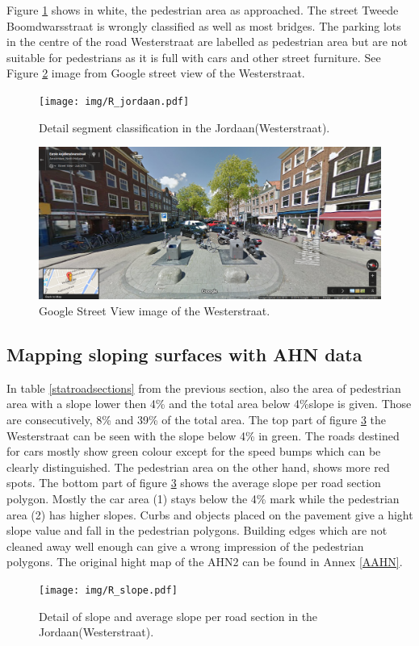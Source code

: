 Figure \ref{jordaanroad} shows in white, the pedestrian area as approached. The street Tweede Boomdwarsstraat is wrongly classified as well as most bridges. The parking lots in the centre of the road Westerstraat are labelled as pedestrian area but are not suitable for pedestrians as it is full with cars and other street furniture. See Figure \ref{westerstraat} image from Google street view of the Westerstraat. 

\begin{figure}[h]
\texttt{[image: img/R\_jordaan.pdf]}
\centering
\caption{Detail segment classification in the Jordaan(Westerstraat).\label{jordaanroad}}
\end{figure} 

\begin{figure}[h]
\includegraphics[width=\textwidth]{img/R_Westerstraat.png}
\centering
\caption{Google Street View image of the Westerstraat.\label{westerstraat}}
\end{figure} 


\clearpage

\subsection{Mapping sloping surfaces with AHN data}
In table \ref{statroadsections} from the previous section, also the area of pedestrian area with a slope lower then 4\% and the total area below 4\%slope is given. Those are consecutively, 8\% and 39\% of the total area.
The top part of figure \ref{jordaanroadslope} the Westerstraat can be seen with the slope below 4\% in green. The roads destined for cars mostly show green colour except for the speed bumps which can be clearly distinguished. The pedestrian area on the other hand, shows more red spots. The bottom part of figure \ref{jordaanroadslope} shows the average slope per road section polygon. Mostly the car area (1) stays below the 4\% mark while the pedestrian area (2) has higher slopes. Curbs and objects placed on the pavement give a hight slope value and fall in the pedestrian polygons. Building edges which are not cleaned away well enough can give a wrong impression of the pedestrian polygons. The original hight map of the AHN2 can be found in Annex \ref{AAHN}.
\begin{figure}[h]
\texttt{[image: img/R\_slope.pdf]}
\centering
\caption{Detail of slope and average slope per road section in the Jordaan(Westerstraat).\label{jordaanroadslope}}
\end{figure} 

